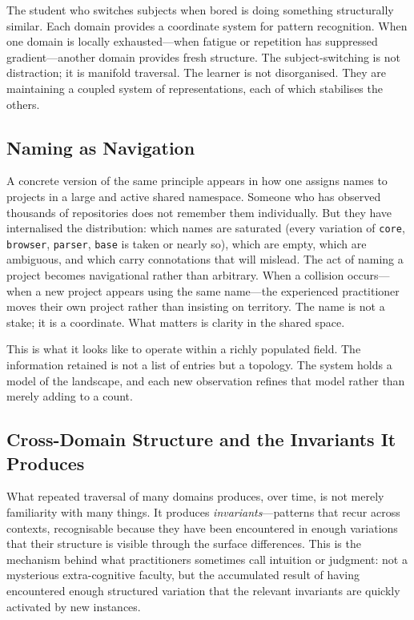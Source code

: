 \documentclass[12pt,oneside]{article}
\theoremstyle{plain}
\theoremstyle{definition}
\theoremstyle{remark}
\begin{document}
The student who switches subjects when bored is doing something structurally
similar. Each domain provides a coordinate system for pattern recognition. When
one domain is locally exhausted---when fatigue or repetition has suppressed
gradient---another domain provides fresh structure. The subject-switching is not
distraction; it is manifold traversal. The learner is not disorganised. They are
maintaining a coupled system of representations, each of which stabilises the
others.

\subsection*{Naming as Navigation}

A concrete version of the same principle appears in how one assigns names to
projects in a large and active shared namespace. Someone who has observed
thousands of repositories does not remember them individually. But they have
internalised the distribution: which names are saturated (every variation of
\texttt{core}, \texttt{browser}, \texttt{parser}, \texttt{base} is taken or
nearly so), which are empty, which are ambiguous, and which carry connotations
that will mislead. The act of naming a project becomes navigational rather than
arbitrary. When a collision occurs---when a new project appears using the same
name---the experienced practitioner moves their own project rather than insisting
on territory. The name is not a stake; it is a coordinate. What matters is
clarity in the shared space.

This is what it looks like to operate within a richly populated field. The
information retained is not a list of entries but a topology. The system holds a
model of the landscape, and each new observation refines that model rather than
merely adding to a count.

\subsection*{Cross-Domain Structure and the Invariants It Produces}

What repeated traversal of many domains produces, over time, is not merely
familiarity with many things. It produces \emph{invariants}---patterns that
recur across contexts, recognisable because they have been encountered in enough
variations that their structure is visible through the surface differences. This
is the mechanism behind what practitioners sometimes call intuition or
judgment: not a mysterious extra-cognitive faculty, but the accumulated result of
having encountered enough structured variation that the relevant invariants are
quickly activated by new instances.
\end{document}
